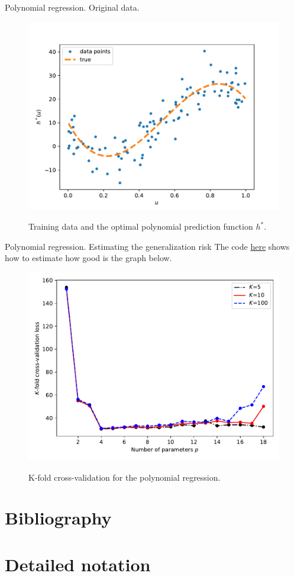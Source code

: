 \documentclass{beamer}
\begin{document}
\begin{frame}{Polynomial regression. Original data.}
  \begin{figure}
    \includegraphics[width=0.7\linewidth]{polydatpy}
    \label{fig:polydatpy}
    \caption{Training data and the optimal polynomial prediction function $h^*$\cite{kroese2020}.}
  \end{figure}
\end{frame}

\begin{frame}{Polynomial regression. Estimating the generalization risk}
    The code \href{https://biocomputing-teaching.github.io/Data-Science-with-Python/code/UNIT3-MC-Methods.html}{here} shows how to estimate how good is the graph below. 
  \begin{figure}
    \includegraphics[width=0.4\linewidth]{crossvalpy}
    \label{fig:crossvalpy}
    \caption{K-fold cross-validation for the polynomial regression\cite{kroese2020}.}
  \end{figure}
\end{frame}

\section{Bibliography}



\section{Detailed notation}
\end{document}
